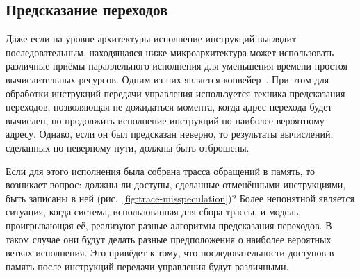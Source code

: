 \subsection{Предсказание переходов}

Даже если на уровне архитектуры исполнение инструкций выглядит последовательным, находящаяся ниже микроархитектура может использовать различные приёмы параллельного исполнения для уменьшения времени простоя вычислительных ресурсов. Одним из них является конвейер~\cite[глава 9]{structured-parallel}. При этом для обработки инструкций передачи управления используется техника предсказания переходов, позволяющая не дожидаться момента, когда адрес перехода будет вычислен, но продолжить исполнение инструкций по наиболее вероятному адресу. Однако, если он был предсказан неверно, то результаты вычислений, сделанных по неверному пути, должны быть отброшены. 

Если для этого исполнения была собрана трасса обращений в память, то возникает вопрос: должны ли доступы, сделанные отменёнными инструкциями, быть записаны в ней (рис.~\ref{fig:trace-misspeculation})? 
Более непонятной является ситуация, когда система, использованная для сбора трассы, и модель, проигрывающая её, реализуют разные алгоритмы предсказания переходов. В таком случае они будут делать разные предположения о наиболее вероятных ветках исполнения. Это привёдет к тому, что последовательности доступов в память после инструкций передачи управления будут различными.

